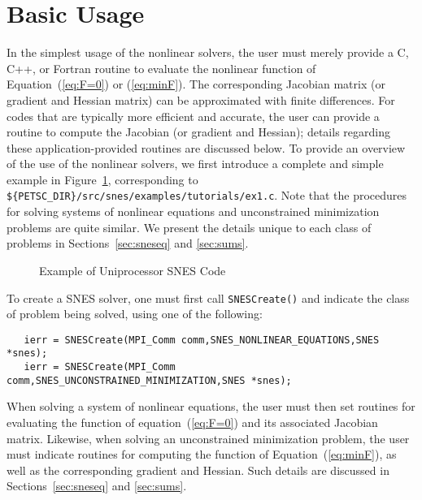\section{Basic Usage}
\label{sec:snesusage}

In the simplest usage of the nonlinear solvers, the user must merely 
provide a C, C++, or Fortran routine to evaluate the nonlinear function 
of Equation~(\ref{eq:F=0}) or (\ref{eq:minF}).
The corresponding Jacobian  matrix 
(or gradient  and Hessian  matrix) 
can be approximated with finite differences.
For codes that are typically more efficient and accurate, the
user can provide a routine to compute the Jacobian (or gradient 
and Hessian); details regarding these application-provided 
routines are discussed below.  
To provide an overview of the use of the nonlinear solvers,
we first introduce a complete and simple example in
Figure~\ref{fig:snesexample}, corresponding to 
{\tt \$\{PETSC\_DIR\}/src/snes/examples/tutorials/ex1.c}.  
Note that the procedures for solving systems
of nonlinear equations and unconstrained minimization problems
are quite similar.  We present the details unique to each class of 
problems in Sections~\ref{sec:sneseq} and \ref{sec:sums}.

\begin{figure}[H]
{\small
{}
}
\caption{Example of Uniprocessor SNES Code}
\label{fig:snesexample}
\end{figure}

To create a SNES solver, one must first call {\tt SNESCreate()} and indicate
the class of problem being solved, using one of the following:
\begin{verbatim}
   ierr = SNESCreate(MPI_Comm comm,SNES_NONLINEAR_EQUATIONS,SNES *snes);
   ierr = SNESCreate(MPI_Comm comm,SNES_UNCONSTRAINED_MINIMIZATION,SNES *snes);
\end{verbatim}
When solving a system of nonlinear equations, the user must then set
routines for evaluating the function of equation~(\ref{eq:F=0}) and its
associated Jacobian matrix.  Likewise, when solving an unconstrained
minimization problem, the user must indicate routines for computing
the function of Equation~(\ref{eq:minF}), as well as the corresponding
gradient and Hessian. Such details are discussed in 
Sections~\ref{sec:sneseq} and \ref{sec:sums}.

